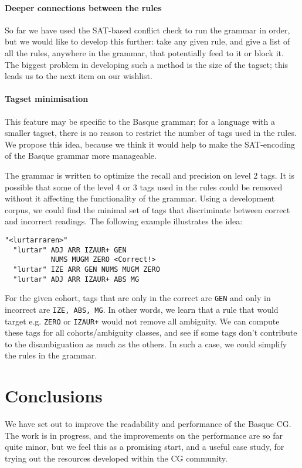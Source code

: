 \documentclass[11pt]{article}
\def\t#1{\texttt{#1}}
\begin{document}
\paragraph{Deeper connections between the rules} So far we have used the
  SAT-based conflict check to run the grammar in order, but we would
  like to develop this further: take any given rule, and give a list
  of all the rules, anywhere in the grammar, that potentially feed to
  it or block it. The biggest problem in developing such a method is
  the size of the tagset; this leads us to the next item on our wishlist. 
\paragraph{Tagset minimisation} This feature may be specific to the
Basque grammar; for a language with a smaller tagset, there is no
reason to restrict the number of tags used in the rules. We propose
this idea, because we think it would help to make the SAT-encoding
of the Basque grammar more manageable.

The grammar is written to optimize the recall and precision on level 2
tags. It is possible that some of the level 4 or 3 tags used in the
rules could be removed without it affecting the functionality of the
grammar. Using a development corpus, we could find the minimal set of
tags that discriminate between correct and incorrect readings. The
following example illustrates the idea:

\begin{verbatim}
"<lurtarraren>"
  "lurtar" ADJ ARR IZAUR+ GEN 
           NUMS MUGM ZERO <Correct!>
  "lurtar" IZE ARR GEN NUMS MUGM ZERO 
  "lurtar" ADJ ARR IZAUR+ ABS MG
\end{verbatim}

\noindent For the given cohort, tags that are only in the correct are \t{GEN} and only in incorrect are \t{IZE, ABS, MG}.
In other words, we learn that a rule that would target e.g. \t{ZERO} or \t{IZAUR+} would not remove all ambiguity.
We can compute these tags for all cohorts/ambiguity classes, and see
if some tags don't contribute to the disambiguation as much as the
others. In such a case, we could simplify the rules in the grammar.


\section{Conclusions}

We have set out to improve the readability and performance of the
Basque CG. The work is in progress, and the improvements on the
performance are so far quite minor, but we feel this as a promising
start, and a useful case study, for trying out the resources developed
within the CG community.
\end{document}
